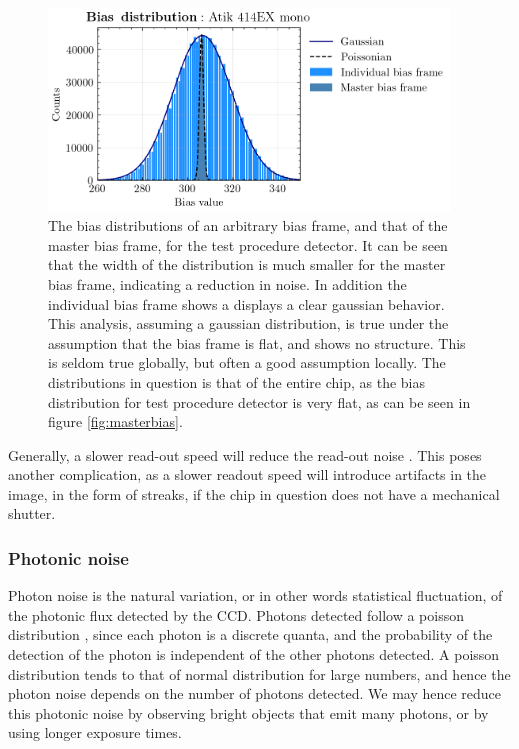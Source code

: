 \documentclass[../main.tex]{subfiles}
\begin{document}
	\begin{figure}[h!]
		\centering
		\includegraphics[width	=0.95\textwidth]{gauss_bias.png}
		\caption{The bias distributions of an arbitrary bias frame, and that of the master bias frame, for the test procedure detector. It can be seen that the width of the distribution is much smaller for the master bias frame, indicating a reduction in noise. In addition the individual bias frame shows a displays a clear gaussian behavior. This analysis, assuming a gaussian distribution, is true under the assumption that the bias frame is flat, and shows no structure. This is seldom true globally, but often a good assumption locally. The distributions in question is that of the entire chip, as the bias distribution for test procedure detector is very flat, as can be seen in figure \ref{fig:masterbias}.}
		\label{fig:rongauss}
	\end{figure}
	
	Generally, a slower read-out speed will reduce the read-out noise \cite{handbookofccdastronomy}. This poses another complication, as a slower readout speed will introduce artifacts in the image, in the form of streaks, if the chip in question does not have a mechanical shutter.  
	
	\subsubsection{Photonic noise}
	Photon noise is the natural variation, or in other words statistical fluctuation, of the photonic flux detected by the CCD. Photons detected follow a poisson distribution \cite{photonnoise}, since each photon is a discrete quanta, and the probability of the detection of the photon is independent of the other photons detected. A poisson distribution tends to that of normal distribution for large numbers, and hence the photon noise depends on the number of photons detected\cite{handbookofccdastronomy}. We may hence reduce this photonic noise by observing bright objects that emit many photons, or by using longer exposure times.
	
\end{document}
